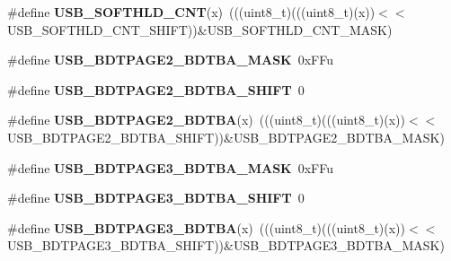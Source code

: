 \begin{DoxyCompactItemize}
\item 
\#define {\bfseries U\+S\+B\+\_\+\+S\+O\+F\+T\+H\+L\+D\+\_\+\+C\+NT}(x)~(((uint8\+\_\+t)(((uint8\+\_\+t)(x))$<$$<$U\+S\+B\+\_\+\+S\+O\+F\+T\+H\+L\+D\+\_\+\+C\+N\+T\+\_\+\+S\+H\+I\+FT))\&U\+S\+B\+\_\+\+S\+O\+F\+T\+H\+L\+D\+\_\+\+C\+N\+T\+\_\+\+M\+A\+SK)\hypertarget{group__USB__Register__Masks_ga6a373b5dfe5c4aa910fd120cc169a4b9}{}\label{group__USB__Register__Masks_ga6a373b5dfe5c4aa910fd120cc169a4b9}

\item 
\#define {\bfseries U\+S\+B\+\_\+\+B\+D\+T\+P\+A\+G\+E2\+\_\+\+B\+D\+T\+B\+A\+\_\+\+M\+A\+SK}~0x\+F\+Fu\hypertarget{group__USB__Register__Masks_ga69407c90a73a26bc60f3f9b75e4bd7c0}{}\label{group__USB__Register__Masks_ga69407c90a73a26bc60f3f9b75e4bd7c0}

\item 
\#define {\bfseries U\+S\+B\+\_\+\+B\+D\+T\+P\+A\+G\+E2\+\_\+\+B\+D\+T\+B\+A\+\_\+\+S\+H\+I\+FT}~0\hypertarget{group__USB__Register__Masks_gae67d0252b1559f854264f0fe52ff6fb5}{}\label{group__USB__Register__Masks_gae67d0252b1559f854264f0fe52ff6fb5}

\item 
\#define {\bfseries U\+S\+B\+\_\+\+B\+D\+T\+P\+A\+G\+E2\+\_\+\+B\+D\+T\+BA}(x)~(((uint8\+\_\+t)(((uint8\+\_\+t)(x))$<$$<$U\+S\+B\+\_\+\+B\+D\+T\+P\+A\+G\+E2\+\_\+\+B\+D\+T\+B\+A\+\_\+\+S\+H\+I\+FT))\&U\+S\+B\+\_\+\+B\+D\+T\+P\+A\+G\+E2\+\_\+\+B\+D\+T\+B\+A\+\_\+\+M\+A\+SK)\hypertarget{group__USB__Register__Masks_ga1b7b12b3e6686e4b15b1cfa072a805eb}{}\label{group__USB__Register__Masks_ga1b7b12b3e6686e4b15b1cfa072a805eb}

\item 
\#define {\bfseries U\+S\+B\+\_\+\+B\+D\+T\+P\+A\+G\+E3\+\_\+\+B\+D\+T\+B\+A\+\_\+\+M\+A\+SK}~0x\+F\+Fu\hypertarget{group__USB__Register__Masks_ga9081479345a744c85a74643600921b64}{}\label{group__USB__Register__Masks_ga9081479345a744c85a74643600921b64}

\item 
\#define {\bfseries U\+S\+B\+\_\+\+B\+D\+T\+P\+A\+G\+E3\+\_\+\+B\+D\+T\+B\+A\+\_\+\+S\+H\+I\+FT}~0\hypertarget{group__USB__Register__Masks_ga9850caac94013a6e84f9af9cbe0e0827}{}\label{group__USB__Register__Masks_ga9850caac94013a6e84f9af9cbe0e0827}

\item 
\#define {\bfseries U\+S\+B\+\_\+\+B\+D\+T\+P\+A\+G\+E3\+\_\+\+B\+D\+T\+BA}(x)~(((uint8\+\_\+t)(((uint8\+\_\+t)(x))$<$$<$U\+S\+B\+\_\+\+B\+D\+T\+P\+A\+G\+E3\+\_\+\+B\+D\+T\+B\+A\+\_\+\+S\+H\+I\+FT))\&U\+S\+B\+\_\+\+B\+D\+T\+P\+A\+G\+E3\+\_\+\+B\+D\+T\+B\+A\+\_\+\+M\+A\+SK)\hypertarget{group__USB__Register__Masks_ga1576cadd83c016ae56239b96238ffeb8}{}\label{group__USB__Register__Masks_ga1576cadd83c016ae56239b96238ffeb8}


\end{DoxyCompactItemize}
